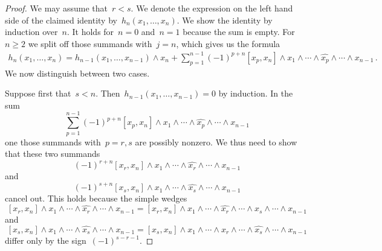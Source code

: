 \begin{proof}
  We may assume that~$r < s$.
  We denote the expression on the left hand side of the claimed identity by~$h_n(x_1, \dotsc, x_n)$.
  We show the identity by induction over~$n$.
  It holds for~$n = 0$ and~$n = 1$ because the sum is empty.
  For~$n \geq 2$ we split off those summands with~$j = n$, which gives us the formula
  \begin{align*}
    h_n(x_1, \dotsc, x_n)
    =
    h_{n-1}(x_1, \dotsc, x_{n-1}) \wedge x_n
    +
    \sum_{p=1}^{n-1}
    (-1)^{p+n}
    [x_p, x_n] \wedge x_1 \wedge \dotsb \wedge \widehat{x_p} \wedge \dotsb \wedge x_{n-1} \,.
  \end{align*}
  We now distinguish between two cases.

  Suppose first that~$s < n$.
  Then~$h_{n-1}(x_1, \dotsc, x_{n-1}) = 0$ by induction.
  In the sum
  \[
    \sum_{p=1}^{n-1}
    (-1)^{p+n}
    [x_p, x_n] \wedge x_1 \wedge \dotsb \wedge \widehat{x_p} \wedge \dotsb \wedge x_{n-1}
  \]
  one those summands with~$p = r, s$ are possibly nonzero.
  We thus need to show that these two summands
  \[
    (-1)^{r+n}
    [x_r, x_n] \wedge x_1 \wedge \dotsb \wedge \widehat{x_r} \wedge \dotsb \wedge x_{n-1}
  \]
  and
  \[
    (-1)^{s+n}
    [x_s, x_n] \wedge x_1 \wedge \dotsb \wedge \widehat{x_s} \wedge \dotsb \wedge x_{n-1}
  \]
  cancel out.
  This holds because the simple wedges
  \[
    [x_r, x_n] \wedge x_1 \wedge \dotsb \wedge \widehat{x_r} \wedge \dotsb \wedge x_{n-1}
    =
    [x_r, x_n] \wedge x_1 \wedge \dotsb \wedge \widehat{x_r} \wedge \dotsb \wedge x_s \wedge \dotsb \wedge x_{n-1}
  \]
  and
  \[
    [x_s, x_n] \wedge x_1 \wedge \dotsb \wedge \widehat{x_s} \wedge \dotsb \wedge x_{n-1}
    =
    [x_s, x_n] \wedge x_1 \wedge \dotsb \wedge x_r \wedge \dotsb \wedge \widehat{x_s} \wedge \dotsb \wedge x_{n-1}
  \]
  differ only by the sign~$(-1)^{s-r-1}$.


\end{proof}
